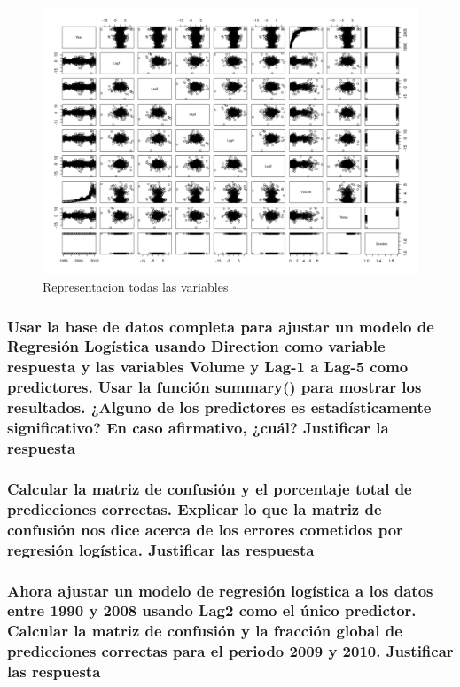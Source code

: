 \begin{figure}[H]
\centering
\includegraphics[scale=.40]{plot_weekly_all.png}
\caption{Representacion todas las variables}
\label{}
\end{figure}



\subsubsection{Usar la base de datos completa para ajustar un modelo de Regresión Logística usando Direction como variable respuesta y las variables Volume y Lag-1 a Lag-5 como predictores. Usar la función summary() para mostrar los resultados. ¿Alguno de los predictores es estadísticamente significativo? En caso afirmativo, ¿cuál? Justificar la respuesta}



\subsubsection{Calcular la matriz de confusión y el porcentaje total de predicciones correctas. Explicar lo que la matriz de confusión nos dice acerca de los errores cometidos por regresión logística. Justificar las respuesta}


\subsubsection{Ahora ajustar un modelo de regresión logística a los datos entre 1990 y 2008 usando Lag2 como el único predictor. Calcular la matriz de confusión y la fracción global de predicciones correctas para el periodo 2009 y 2010. Justificar las respuesta}

